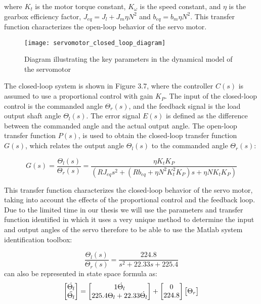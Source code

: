  where $K_t$ is the motor torque constant, $K_\omega$ is the speed constant, and $\eta$ is the gearbox efficiency factor, $J_{eq} = J_l + J_m\eta N^2$ and $b_{eq} = b_m\eta N^2$. This transfer function characterizes the open-loop behavior of the servo motor.\\
\begin{figure}[h]
    \centering
    \texttt{[image: servomotor\_closed\_loop\_diagram]}
    \caption{Diagram illustrating the key parameters in the dynamical model of the servomotor}
\end{figure}
The closed-loop system is shown in Figure 3.7, where the controller $C(s)$ is assumed to use a proportional control with gain $K_P$. The input of the closed-loop control is the commanded angle $\Theta_r(s)$, and the feedback signal is the load output shaft angle $\Theta_l(s)$. The error signal $E(s)$ is defined as the difference between the commanded angle and the actual output angle. The open-loop transfer function $P(s)$, is used to obtain the closed-loop transfer function $G(s)$, which relates the output angle $\Theta_l(s)$ to the commanded angle $\Theta_r(s)$:

\begin{equation} 
G(s) = \frac{\Theta_l(s)}{\Theta_r(s)} = \frac{\eta K_t K_P}{(RJ_{eq}s^2 + (Rb_{eq} + \eta N^2 K_t^2 K_P)s + \eta N K_t K_P)} 
\end{equation}

This transfer function characterizes the closed-loop behavior of the servo motor, taking into account the effects of the proportional control and the feedback loop.
Due to the limited time in our thesis we will use the parameters and transfer function identified in\cite{santanacob} which it uses a very unique method to determine the input and output angles of the servo therefore to be able to use the Matlab system identification toolbox:

\begin{equation} \frac{\Theta_l(s)}{\Theta_r(s)} = \frac{224.8}{s^2 + 22.33s + 225.4} 
\end{equation}
can also be represented in state space formula as:
\begin{equation}
\begin{bmatrix}
\Dot{\Theta_l}\\
\Ddot{\Theta_l}\\
\end{bmatrix}
=
\begin{bmatrix}
1\Dot{\Theta_l}\\
225.4\Theta_l + 22.33\dot{\Theta_l}\\
\end{bmatrix}
+ 
\begin{bmatrix}
0  \\
224.8 \\
\end{bmatrix}
\begin{bmatrix}
\Theta_r  \\
\end{bmatrix}
\end{equation}


